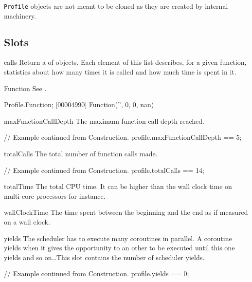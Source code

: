 \lstinline|Profile| objects are not meant to be cloned as they are created
by  internal machinery.

\subsection{Slots}

\begin{urbiscriptapi}
\item[calls]%
  Return a  of  objects. Each
  element of this list describes, for a given function, statistics about how
  many times it is called and how much time is spent in it.


\item[Function]
  See .
\begin{urbiscript}
Profile.Function;
[00004990] Function('', 0, 0, nan)
\end{urbiscript}


\item[maxFunctionCallDepth]%
  The maximum function call depth reached.
\begin{urbiassert}
// Example continued from Construction.
profile.maxFunctionCallDepth == 5;
\end{urbiassert}


\item[totalCalls]%
  The total number of function calls made.
\begin{urbiassert}
// Example continued from Construction.
profile.totalCalls == 14;
\end{urbiassert}


\item[totalTime]%
  The total CPU time. It can be higher than the wall clock time on
  multi-core processors for instance.


\item[wallClockTime]%
  The time spent between the beginning and the end as if measured on a wall
  clock.


\item[yields]%
  The scheduler has to execute many coroutines in parallel. A coroutine
  yields when it gives the opportunity to an other to be executed until this
  one yields and so on\dots This slot contains the number of scheduler
  yields.
\begin{urbiassert}
// Example continued from Construction.
profile.yields == 0;
\end{urbiassert}
\end{urbiscriptapi}


